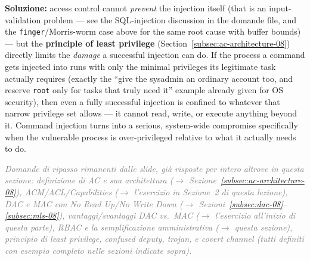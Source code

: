 \documentclass[12pt, a4paper]{article}
\newcounter{esercizio}[section]
\begin{document}
\textbf{Soluzione:} access control cannot \emph{prevent} the injection itself (that is an input-validation problem --- see the SQL-injection discussion in the domande file, and the \texttt{finger}/Morris-worm case above for the same root cause with buffer bounds) --- but the \textbf{principle of least privilege} (Section~\ref{subsec:ac-architecture-08}) directly limits the \emph{damage} a successful injection can do. If the process a command gets injected into runs with only the minimal privileges its legitimate task actually requires (exactly the ``give the sysadmin an ordinary account too, and reserve \texttt{root} only for tasks that truly need it'' example already given for OS security), then even a fully successful injection is confined to whatever that narrow privilege set allows --- it cannot read, write, or execute anything beyond it. Command injection turns into a serious, system-wide compromise specifically when the vulnerable process is over-privileged relative to what it actually needs to do.

\textcolor{gray}{\textit{Domande di ripasso rimanenti dalle slide, già risposte per intero altrove in questa sezione: definizione di AC e sua architettura ($\to$ Sezione~\ref{subsec:ac-architecture-08}), ACM/ACL/Capabilities ($\to$ l'esercizio in Sezione~2 di questa lezione), DAC e MAC con No Read Up/No Write Down ($\to$ Sezioni~\ref{subsec:dac-08}--\ref{subsec:mls-08}), vantaggi/svantaggi DAC vs.\ MAC ($\to$ l'esercizio all'inizio di questa parte), RBAC e la semplificazione amministrativa ($\to$ questa sezione), principio di least privilege, confused deputy, trojan, e covert channel (tutti definiti con esempio completo nelle sezioni indicate sopra).}}
\end{document}
